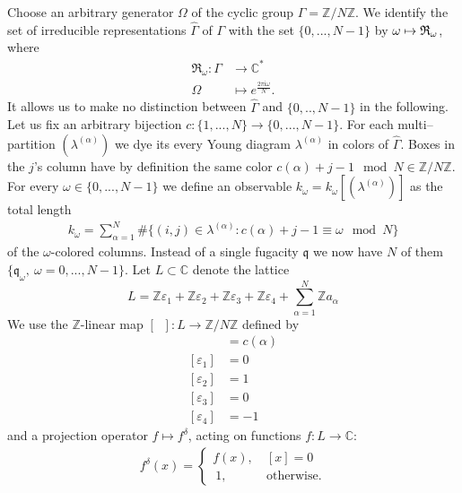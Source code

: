 \documentclass[12pt]{article}
\numberwithin{equation}{section}
\newcommand\beq{\begin{equation}}
\newcommand\eeq{\end{equation}}
\theoremstyle{definition}
\newcommand {\BC}   {\mathbb C}
\newcommand {\ii} {\mathrm{i}}
\begin{document}
Choose an arbitrary generator $\Omega$ of the cyclic group $\Gamma = \mathbb{Z}/N\mathbb{Z}$. We identify the set of irreducible representations $\hat{\Gamma}$ of $\Gamma$ with the set $\{0, ..., N-1\}$ by $\omega \mapsto \frak{R}_{\omega}$,
where
\begin{align*}
    \mathfrak{R}_{\omega}: \Gamma &\rightarrow \mathbb{C}^{*}\\
    \Omega &\mapsto e^{\frac{2 \pi {\ii}\omega}{N}}.
\end{align*}
It allows us to make no distinction between $\hat{\Gamma}$ and $\{0, .., N-1\}$ in the following. Let us fix an arbitrary bijection $c: \{1, ..., N\} \rightarrow \{0, ..., N-1\}$.
For each multi--partition $(\lambda^{(\alpha)})$ we dye its every Young diagram $\lambda^{(\alpha)}$ in colors of $\hat{\Gamma}$.
Boxes in the $j$'s column have by definition the same color $c(\alpha) + j - 1 \mod N \in \mathbb{Z}/N\mathbb{Z}$.
For every $\omega \in \{0, ..., N-1\}$ we define an observable $k_{\omega} = k_{\omega}[(\lambda^{(\alpha)})]$ as the total length
\begin{align*}
    k_{\omega} = \sum\limits_{\alpha = 1}^{N} \#\{(i, j) \in \lambda^{(\alpha)}:c(\alpha) + j - 1 \equiv \omega \mod N\}
\end{align*}
of the $\omega$-colored columns. Instead of a single fugacity $\mathfrak{q}$ we now have $N$ of them
    $\{ \mathfrak{q}_{\omega}, ~ \omega = 0, ..., N-1 \}$.
    Let $L \subset {\BC}$ denote the lattice
    \beq
    L = \mathbb{Z}\varepsilon_{1} +  \mathbb{Z}\varepsilon_{2} + 
   \mathbb{Z}\varepsilon_{3} +  \mathbb{Z}\varepsilon_{4} +  \sum\limits_{\alpha = 1}^{N} \mathbb{Z}a_{\alpha}
   \eeq
We use the $\mathbb{Z}$-linear map $ [\;\;]: L \rightarrow \mathbb{Z}/N\mathbb{Z}$ defined by
\begin{align*}
    [a_{\alpha}] &= c(\alpha)\\
   [\varepsilon_{1}] &= 0\\
      [\varepsilon_{2}] &= 1\\
         [\varepsilon_{3}] &= 0\\
            [\varepsilon_{4}] &= -1
\end{align*}
and a projection operator $f \mapsto f^{\delta}$, acting on functions $f:L \rightarrow \mathbb{C}$:
\begin{align}\label{deltadef}
    f^{\delta}(x) = 
    \begin{cases}
        f(x), \ & [x] = 0 \\
       \  1, \ &  \text{otherwise}.
    \end{cases}
\end{align}
\end{document}
